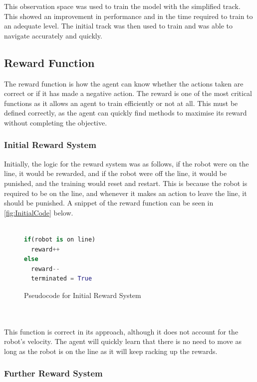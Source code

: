 \documentclass[a4paper,12pt]{article}
\begin{document}
 
This observation space was used to train the model with the simplified track. This showed an improvement in performance and in the time required to train to an adequate level. The initial track was then used to train and was able to navigate accurately and quickly.
 


\subsection{Reward Function}

The reward function is how the agent can know whether the actions taken are correct or if it has made a negative action. The reward is one of the most critical functions as it allows an agent to train efficiently or not at all. This must be defined correctly, as the agent can quickly find methods to maximise its reward without completing the objective.

\subsubsection{Initial Reward System}

Initially, the logic for the reward system was as follows, if the robot were on the line, it would be rewarded, and if the robot were off the line, it would be punished, and the training would reset and restart. This is because the robot is required to be on the line, and whenever it makes an action to leave the line, it should be punished. A snippet of the reward function can be seen in \autoref{fig:InitialCode} below.
\\\\

\begin{figure}[H]
\begin{lstlisting}[language=Python]
if(robot is on line)
  reward++
else
  reward--
  terminated = True
\end{lstlisting}
\caption{Pseudocode for Initial Reward System}
\label{fig:InitialCode}
\end{figure}
\\\\
This function is correct in its approach, although it does not account for the robot's velocity. The agent will quickly learn that there is no need to move as long as the robot is on the line as it will keep racking up the rewards.
 

\subsubsection{Further Reward System}
\end{document}
